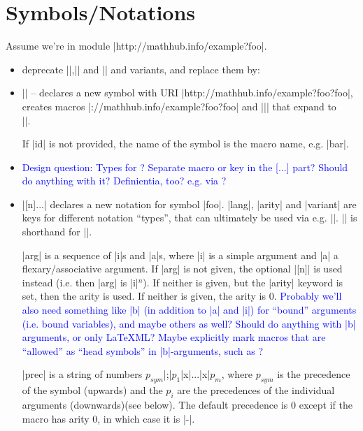 \documentclass{bluenote}
\def\designquestion#1{\textcolor{blue}{#1}}
\begin{document}
\section{Symbols/Notations}

Assume we're in module |http://mathhub.info/example?foo|.

\begin{itemize}
  \item deprecate |\symdef|,|\symvariant| and |\symi| and variants, and replace them by:
  \item || -- declares a new symbol with URI |http://mathhub.info/example?foo?foo|,
    creates macros |\http://mathhub.info/example?foo?foo| and |\bar| that expand to\\
    ||.

    If |id| is not provided, the name of the symbol is the macro name, e.g. |bar|.

  \item \designquestion{Design question: Types for \texttt{\detokenize{\symdecl}}?
    Separate macro or key in the [...] part? Should \sTeX do anything with it?
    Definientia, too? e.g. via \texttt{\detokenize{\abbrdef}}?}
  \item |[n]{...}| declares
    a new notation for symbol |foo|. |lang|, |arity| and |variant| are keys for different
    notation ``types'', that can ultimately be used via e.g. |\foo[lang=en,arity=2,variant=op]|.
    |\foo[op]| is shorthand for |\foo[variant=op]|.

    |arg| is a sequence of |i|s and |a|s, where |i| is a simple argument and |a| a
    flexary/associative argument. If |arg| is not given, the optional |[n]| is used
    instead (i.e. then |arg| is |i|$^n$). If neither is given, but the |arity| keyword
    is set, then the arity is used. If neither is given, the arity is $0$.
    \designquestion{Probably we'll also need something like |b| (in addition to |a| and 
    |i|) for ``bound'' arguments (i.e. bound variables), and maybe others as well?
    Should \sTeX do anything with |b| arguments, or only LaTeXML? Maybe explicitly mark 
    macros that are ``allowed'' as ``head symbols'' in |b|-arguments, 
    such as \texttt{\detokenize{\setin}}?}

    |prec| is a string of numbers $p_{sym}$|;|$p_1$|x|...|x|$p_m$, where $p_{sym}$ is
    the precedence of the symbol (upwards) and the $p_i$ are the precedences of the
    individual arguments (downwards)(see below). The default precedence is $0$ except if
    the macro has arity $0$, in which case it is |-\infprec|.


\end{itemize}
\end{document}
